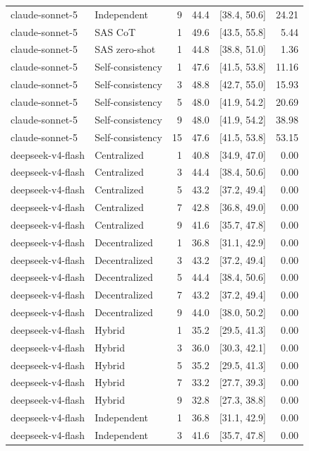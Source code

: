 \begin{tabular}{@{}llrrrr@{}}
claude-sonnet-5 & Independent & 9 & 44.4 & [38.4, 50.6] & 24.21 \\
claude-sonnet-5 & SAS CoT & 1 & 49.6 & [43.5, 55.8] & 5.44 \\
claude-sonnet-5 & SAS zero-shot & 1 & 44.8 & [38.8, 51.0] & 1.36 \\
claude-sonnet-5 & Self-consistency & 1 & 47.6 & [41.5, 53.8] & 11.16 \\
claude-sonnet-5 & Self-consistency & 3 & 48.8 & [42.7, 55.0] & 15.93 \\
claude-sonnet-5 & Self-consistency & 5 & 48.0 & [41.9, 54.2] & 20.69 \\
claude-sonnet-5 & Self-consistency & 9 & 48.0 & [41.9, 54.2] & 38.98 \\
claude-sonnet-5 & Self-consistency & 15 & 47.6 & [41.5, 53.8] & 53.15 \\
deepseek-v4-flash & Centralized & 1 & 40.8 & [34.9, 47.0] & 0.00 \\
deepseek-v4-flash & Centralized & 3 & 44.4 & [38.4, 50.6] & 0.00 \\
deepseek-v4-flash & Centralized & 5 & 43.2 & [37.2, 49.4] & 0.00 \\
deepseek-v4-flash & Centralized & 7 & 42.8 & [36.8, 49.0] & 0.00 \\
deepseek-v4-flash & Centralized & 9 & 41.6 & [35.7, 47.8] & 0.00 \\
deepseek-v4-flash & Decentralized & 1 & 36.8 & [31.1, 42.9] & 0.00 \\
deepseek-v4-flash & Decentralized & 3 & 43.2 & [37.2, 49.4] & 0.00 \\
deepseek-v4-flash & Decentralized & 5 & 44.4 & [38.4, 50.6] & 0.00 \\
deepseek-v4-flash & Decentralized & 7 & 43.2 & [37.2, 49.4] & 0.00 \\
deepseek-v4-flash & Decentralized & 9 & 44.0 & [38.0, 50.2] & 0.00 \\
deepseek-v4-flash & Hybrid & 1 & 35.2 & [29.5, 41.3] & 0.00 \\
deepseek-v4-flash & Hybrid & 3 & 36.0 & [30.3, 42.1] & 0.00 \\
deepseek-v4-flash & Hybrid & 5 & 35.2 & [29.5, 41.3] & 0.00 \\
deepseek-v4-flash & Hybrid & 7 & 33.2 & [27.7, 39.3] & 0.00 \\
deepseek-v4-flash & Hybrid & 9 & 32.8 & [27.3, 38.8] & 0.00 \\
deepseek-v4-flash & Independent & 1 & 36.8 & [31.1, 42.9] & 0.00 \\
deepseek-v4-flash & Independent & 3 & 41.6 & [35.7, 47.8] & 0.00 \\

\end{tabular}
